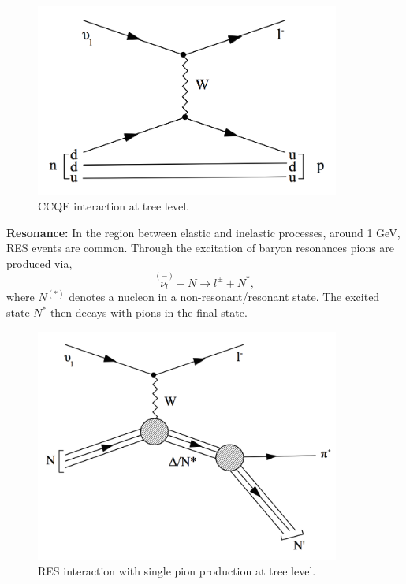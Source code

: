 \begin{figure}[htbp]
\begin{center}
\includegraphics[width=100mm]{Introduction/IntroductionFigs/feynmanDiagramsCCQE.png}
\caption{CCQE interaction at tree level.}
\label{fig:feynmanDiagramCCQE}
\end{center}
\end{figure}

\textbf{Resonance:} In the region between elastic and inelastic processes, around 1 GeV, RES events are common. Through the excitation of baryon resonances pions are produced via,
\begin{equation}
\overset{(-)}{\nu_{l}} + N \rightarrow l^{\pm} + N^{\ast},
\end{equation}
where $N^{(\ast)}$ denotes a nucleon in a non-resonant/resonant state. The excited state $N^{\ast}$ then decays with pions in the final state.
\begin{figure}[htbp]
\begin{center}
\includegraphics[width=100mm]{Introduction/IntroductionFigs/feynmanDiagramsRES.png}
\caption{RES interaction with single pion production at tree level.}
\label{fig:feynmanDiagramCCQE}
\end{center}
\end{figure}

